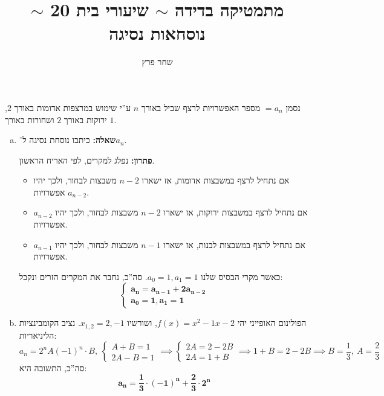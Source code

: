 \documentclass[]{article}
\author{שחר פרץ}
\title{מתמטיקה בדידה $\sim$ שיעורי בית 20 $\sim$ נוסחאות נסיגה}
\begin{document}
	\maketitle
	
	\section{} %
	נסמן $=a_n$ מספר האפשרויות לרצף שביל באורך $n$ ע''י שימוש במרצפות אדומות באורך $2$, ירוקות באורך $2$ ושחורות באורך $1$. 
	\begin{enumerate}[a)]
		\item \textbf{שאלה: }כיתבו נוסחת נסיגה ל־$a_n$. 
		
		\textbf{פתרון: }נפלג למקרים, לפי האריח הראשון. 
		\begin{itemize}
			\item אם נתחיל לרצף במשבצות אדומות, אז ישארו $n - 2$ משבצות לבחור, ולכך יהיו $a_{n - 2}$ אפשרויות. 
			\item אם נתחיל לרצף במשבצות ירוקות, אז ישארו $n - 2$ משבצות לבחור, ולכך יהיו $a_{n - 2}$ אפשרויות. 
			\item אם נתחיל לרצף במשבצות לבנות, אז ישארו $n - 1$ משבצות לבחור, ולכך יהיו $a_{n - 1}$ אפשרויות. 
		\end{itemize}
		כאשר מקרי הבסיס שלנו $a_0 = 1, a_1 = 1 $. 
		סה''כ, נחבר את המקרים הזרים ונקבל: 
		\[ \begin{cases}
			\bm{a_{n} = a_{n - 1} + 2a_{n - 2}} \\
			\bm{a_0 = 1, a_1 = 1}
		\end{cases} \]
		\item הפולינום האופייני יהי $f(x) = x^2 - 1x - 2$, ושורשיו $x_{1, 2} = 2, -1$. נציב הקומבינציות הליניאריות: 
		\[ a_n = 2^nA (-1)^n \cdot B, \ \begin{cases}
			A + B = 1 \\
			2A - B = 1
		\end{cases} \implies \begin{cases}
			2A = 2 - 2B \\
			2A = 1 + B
		\end{cases} \implies 1 + B = 2 - 2B \implies B = \frac{1}{3}, \ A = \frac{2}{3}\]
		סה''כ, התשובה היא: 
		\[ \bm{a_n = \frac{1}{3} \cdot (-1)^n + \frac{2}{3} \cdot 2^n} \]
	\end{enumerate}
\end{document}

